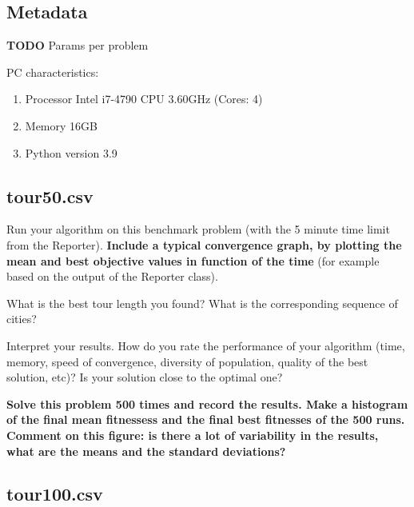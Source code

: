 \documentclass[a4paper,10pt]{article}
\newcommand{\ReplaceMe}[1]{{\color{blue}#1}}
\begin{document}
\subsection{Metadata}

	\textbf{TODO} Params per problem

	PC characteristics:
	\begin{enumerate}
		\item Processor Intel i7-4790 CPU \@ 3.60GHz (Cores: 4)
		\item Memory 16GB
		\item Python version 3.9
	\end{enumerate}


\subsection{tour50.csv}

\ReplaceMe{Run your algorithm on this benchmark problem (with the 5 minute time limit from the Reporter). \textbf{Include a typical convergence graph, by plotting the mean and best objective values in function of the time} (for example based on the output of the Reporter class).

What is the best tour length you found? What is the corresponding sequence of cities?

Interpret your results. How do you rate the performance of your algorithm (time, memory, speed of convergence, diversity of population, quality of the best solution, etc)? Is your solution close to the optimal one?

\textbf{Solve this problem 500 times and record the results. Make a histogram of the final mean fitnessess and the final best fitnesses of the 500 runs. Comment on this figure: is there a lot of variability in the results, what are the means and the standard deviations?}
}
\subsection{tour100.csv}\label{sec_shorttour}
\end{document}
